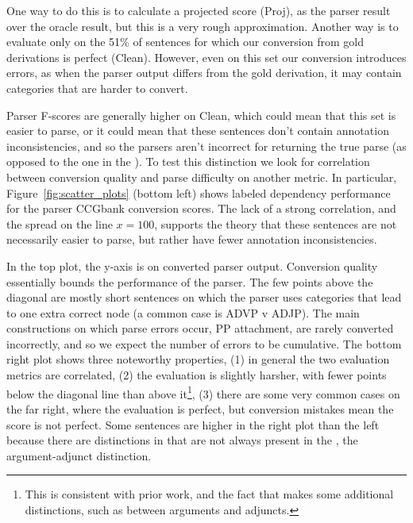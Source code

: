 One way to do this is to calculate a projected score (Proj), as the
parser result over the oracle result, but this is a very rough approximation.
Another way is to evaluate only on the 51\% of sentences for which our
conversion from gold \ccg derivations is perfect (Clean).  However,
even on this set our conversion introduces errors, as when the parser output differs from the gold derivation, it may
contain categories that are harder to convert.

Parser F-scores are generally higher on Clean, which could mean that this
set is easier to parse, or it could mean that these sentences don't contain
annotation inconsistencies, and so the parsers aren't incorrect for returning
the true parse (as opposed to the one in the \ptb).  To test this distinction
we look for correlation between conversion quality and parse difficulty on
another metric.  In particular, Figure~\ref{fig:scatter_plots} (bottom left) shows
\ccg labeled dependency performance for the \candc parser \myvs CCGbank
conversion \parseval scores. The lack of a strong correlation, and the spread
on the line $x=100$, supports the theory that these sentences are not
necessarily easier to parse, but rather have fewer annotation inconsistencies.

In the top plot, the y-axis is \parseval on converted \candc parser output.
Conversion quality essentially bounds the performance of the parser.
The few points above the diagonal are mostly short sentences on which the \candc parser uses categories that lead to one extra correct node (a common case is ADVP v ADJP).
The main constructions on which parse errors occur, \myeg PP attachment, are rarely converted incorrectly, and so we expect the number of errors to be cumulative.
The bottom right plot shows three noteworthy properties, (1) in general the two evaluation metrics are correlated, (2) the \ccg evaluation is slightly harsher, with fewer points below the diagonal line than above it\footnote{This is consistent with prior work, and the fact that \ccg makes some additional distinctions, such as between arguments and adjuncts.}, (3) there are some very common cases on the far right, where the \ccg evaluation is perfect, but conversion mistakes mean the \ptb score is not perfect.
Some sentences are higher in the right plot than the left because there are distinctions in \ccg that are not always present in the \ptb, \myeg the argument-adjunct distinction.

